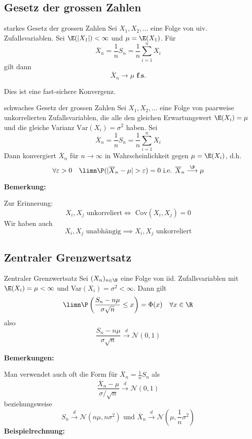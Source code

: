 \subsection{Gesetz der grossen Zahlen}
\begin{mainbox}{starkes Gesetz der grossen Zahlen}
    Sei $X_1, X_2, \ldots$ eine Folge von uiv. Zufallsvariablen. Sei $\E(|X_1|)<\infty$ und $\mu = \E(X_1)$. Für
    $$\overline{X}_n = \frac{1}{n}S_n = \frac{1}{n}\sum_{i = 1}^{n}X_i$$
    gilt dann
    $$\overline{X}_n \longrightarrow \mu \textbf{ f.s.}$$
\end{mainbox}
Dies ist eine fast-sichere Konvergenz.
\begin{mainbox}{schwaches Gesetz der grossen Zahlen}
    Sei $X_1, X_2, ...$ eine Folge von paarweise unkorrelierten Zufallsvariablen, die alle den gleichen Erwartungswert $\E(X_i) = \mu$ und die gleiche Varianz $\text{Var}(X_i) = \sigma^2$ haben.
    Sei 
    $$\overline{X}_n = \frac{1}{n}S_n = \frac{1}{n}\sum_{i = 1}^{n}X_i$$
    Dann konvergiert $\overline{X}_n$ für $n \to \infty$ in Wahrscheinlichkeit gegen $\mu = \E(X_i)$, d.h.
    $$\forall \varepsilon > 0 \quad \limn \P(|\overline{X}_n - \mu| > \varepsilon) = 0 \text{ i.e. } \overline{X}_n \overset{\P}{\longrightarrow} \mu$$
\end{mainbox}
\textbf{Bemerkung: }

Zur Erinnerung: 
$$X_i, X_j \text{ unkorreliert} \iff \text{ Cov}(X_i, X_j) = 0$$
Wir haben auch 
$$X_i, X_j \text{ unabhängig} \implies X_i, X_j \text{ unkorreliert}$$

\subsection{Zentraler Grenzwertsatz}
\begin{mainbox}{Zentraler Grenzwertsatz}
    Sei $(X_n)_{n\in \N}$ eine Folge von iid. Zufallsvariablen mit $\E(X_i) = \mu < \infty$ und Var$(X_i) = \sigma^2 < \infty$.
    Dann gilt 
    $$\limn \P\left(\frac{S_n - n \mu}{\sigma \sqrt{n}} \leq x\right) = \Phi(x) \quad \forall x \in \R$$
    also
    $$\frac{S_n - n \mu}{\sigma \sqrt{n}} \overset{d}{\longrightarrow} \mathcal{N}(0,1)$$
\end{mainbox}
\textbf{Bemerkungen: }

Man verwendet auch oft die Form für $\overline{X}_n = \frac{1}{n}S_n$ als
$$\frac{\overline{X}_n - \mu}{\sigma / \sqrt{n}} \overset{d}{\longrightarrow} \mathcal{N}(0,1)$$
beziehungsweise
$$S_n \overset{d}{\longrightarrow} \mathcal{N}(n\mu, n \sigma^2) \text{ und } \overline{X}_n \overset{d}{\longrightarrow} \mathcal{N}\left(\mu, \frac{1}{n}\sigma^2\right)$$
\textbf{Beispielrechnung:}

